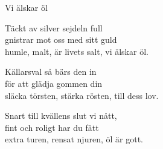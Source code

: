 \begin{song}{Vi älskar öl}
	
	
	
	
	Täckt av silver sejdeln full\\
	gnistrar mot oss med sitt guld\\
	humle, malt, är livets salt, vi älskar öl.

	Källarsval så bärs den in\\
	för att glädja gommen din\\
	släcka törsten, stärka rösten, till dess lov.

	Snart till kvällens slut vi nått,\\
	fint och roligt har du fått\\
	extra turen, rensat njuren, öl är gott.
	
\end{song}
